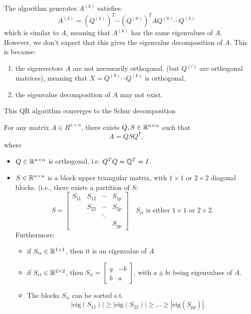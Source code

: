 \documentclass[../main/main.tex]{subfiles}
\begin{document}
The algorithm generates $A^{(k)}$ satisfies: \[
	A^{(k)}=\left( Q^{(k)} \right) ^{T}\cdots\left( Q^{(0)} \right) ^{T}AQ^{(0)}\cdots Q^{(k)}
\] which is similar to $A$, meaning that  $A^{(k)}$ has the same eigenvalues of $A$.\\

However, we don't expect that this gives the eigenvalue decomposition of $A$. This is because:
\begin{enumerate}
	\item the eigenvectors $A$ are not necessarily orthogonal. (but $Q^{(i)}$ are orthogonal matrices), meaning that $X=Q^{(0)}\cdots Q^{(k)}$ is orthogonal.
	\item the eigenvalue decomposition of $A$ may not exist.
\end{enumerate}

This QR algorithm converges to the Schur decomposition
\begin{definition}
	For any matrix $A\in R^{n\times n}$, there exists $Q,S\in \mathbb{R}^{n\times n}$ such that \[
	A=QSQ^{T}
	,\] where
	\begin{itemize}
		\item $Q\in \mathbb{R}^{n\times n}$ is orthogonal, i.e. $Q^{T}Q=\mathbb{Q}^{T}=I$. 
		\item $S\in \mathbb{R}^{n\times n}$ is a block upper triangular matrix, with $1\times 1$ or $2\times 2$ diagonal blocks.
			(i.e., there exists a partition of $S$:  \[
				S= \begin{bmatrix} S_{11}&S_{12}&\cdots &S_{1p} \\ & S_{22} & \cdots & S_{2p}\\ &&\ddots & \\ &&&S_{pp} \end{bmatrix} \quad S_{ii}\text{ is either $1\times 1$ or $2\times 2$}
			.\]  Furthermore:
			\begin{itemize}
				\item if $S_{ii}\in \mathbb{R}^{1\times 1}$, then it is an eigenvalue of $A$
				\item if  $S_{ii}\in \mathbb{R}^{2\times 2}$, then $S_{ii} = \begin{bmatrix} q&-b\\b&a \end{bmatrix} $, with $a\pm bi$ being eigenvalues of $A$. 
				\item The blocks $S_{ii}$ can be sorted s.t. \[
						|\text{eig}(S_{11})|\ge |\text{eig}(S_{22})|\ge \ldots\ge |\text{eig}(S_{pp})|
				.\] 
			\end{itemize}
	\end{itemize}
\end{definition}
\end{document}
